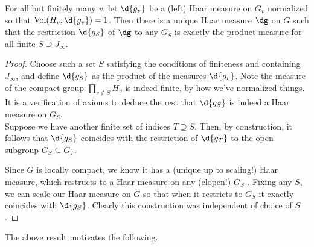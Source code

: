 \documentclass[11pt, x11names, openany]{book}
\begin{document}
\begin{prop}
\label{prop: product measure on resprod}
For all but finitely many $v$, let $\d{g_v}$ be a (left) Haar measure on $G_v$ normalized so that $\vol(H_v, \d{g_v}) = 1$. Then there is a unique Haar measure $\dg$ on $G$ such that the restriction $\d{g_S}$ of $\dg$ to any $G_S$ is exactly the product measure for all finite $S \supseteq J_\infty$.
\end{prop}
\begin{proof}
Choose such a set $S$ satisfying the conditions of finiteness and containing $J_\infty$, and define $\d{g_S}$ as the product of the measures $\d{g_v}$. Note the measure of the compact group $\prod_{v \notin S} H_v$ is indeed finite, by how we've normalized things. It is a verification of axioms to deduce the rest that $\d{g_S}$ is indeed a Haar measure on $G_S$.\\
Suppose we have another finite set of indices $T \supseteq S$. Then, by construction,
it follows that $\d{g_S}$ coincides with the restriction of $\d{g_T}$ to the open subgroup $G_S \subseteq G_T$.

Since $G$ is locally compact, we know it has a (unique up to scaling!) Haar measure, which restructs to a Haar measure on any (clopen!) $G_S$ . Fixing any $S$, we can scale our Haar measure on $G$ so that when it restricts to $G_S$ it exactly coincides with $\d{g_S}$. Clearly this construction was independent of choice of $S$.
\end{proof}

The above result motivates the following.
\end{document}
